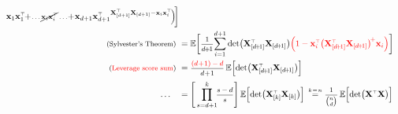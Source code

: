 \documentclass{beamer}
\begin{document}
\begin{frame}
{\begin{align*}
{\x_{1}\x_{1}^\top\!\!+\!\text{\fontsize{8}{8}\selectfont$\dots
\cancel{\x_{i}\x_{i}^\top}\dots $}\!\!+\!\x_{{d+1}}\x_{{d+1}}^\top }^{\X_{[d+1]}^{\top}\X_{[d+1]}-\x_{i}\x_{i}^\top}\!\Big)\!\bigg]\\
\hspace{-9mm}\text{\fontsize{8}{8}\selectfont(Sylvester's Theorem)}\ 
&=\E\bigg[\text{\fontsize{8}{8}\selectfont$\frac{1}{d\!\!+\!\!1}$}\!
\sum_{i=1}^{d+1} 
\det\!\big(\X_{[d\!+\!1]}^{\top}\X_{[d\!+\!1]}\big)\Red{\Big(1 - \x_{i}^\top\big(\X_{[d\!+\!1]}^{\top}\X_{[d\!+\!1]}\big)^{\!+}
\x_{i}\Big)}\bigg]\\
\hspace{-9mm}\text{\fontsize{8}{8}\selectfont(\Red{Leverage score sum})}\ &=
\text{\fontsize{8}{8}\selectfont$\frac{\Red{(d\!+\!1) - d}}{d\!+\!1}$} \,\E\Big[\!\det\!\big(\X_{[d\!+\!1]}^{\top}\X_{[d\!+\!1]}\big) \Big]\\[0.7mm]
\dots\quad &=\Bigg[\prod_{s=d+1}^k \!\!\text{\fontsize{8}{8}\selectfont$\frac{s-d}{s}$}\Bigg]
\,\E\Big[\!\det\!\big(\X_{[k]}^{\top}\X_{[k]}\big) \Big]
\, \overset{\text{\fontsize{6}{6}\selectfont$k\!=\!n$}}{=} \text{\fontsize{8}{8}\selectfont$\frac{1}{{n\choose d}}$} \,\E\Big[\!\det\!\big(\X^{\top}\X\big)\Big] %
\end{align*}
}
\only<9>{
\vspace{3.25mm}
\begin{align*}
\hspace{-3.25mm}\E\Big[
F\big(\X_{[k]}\big)\Big]
\quad\, &=\quad\,
\text{\fontsize{8}{8}\selectfont$\frac{1}{k\!\!+\!\!1}$}\!\sum_{i=1}^{k+1}
\E\Big[F\big(\X_{[k\!+\!1]-i}\big)\Big]\\
&=\quad\,
\E\bigg[\text{\fontsize{8}{8}\selectfont$\frac{1}{k\!\!+\!\!1}$} \Red{\sum_{i=1}^{k+1}
F\big(\X_{[k\!+\!1]-i}\big)}\bigg]\\
 \hspace{-3.25mm}\text{\fontsize{8}{8}\selectfont(\Red{$d$-modularity})}\quad
        &=
\text{\fontsize{8}{8}\selectfont$\frac{\Red{(k\!+\!1) - d}}{k\!+\!1}$} \,\E\Big[
\Red{F\big(\X_{[k\!+\!1]}\big)} \Big]\\[1.1mm]
\dots\quad &=\Bigg[\prod_{s=k+1}^n \!\!\text{\fontsize{8}{8}\selectfont$\frac{s-d}{s}$}\Bigg]
\,\E\Big[F\big(\X_{[n]}\big) \Big]
\hspace{4.05cm}~ %
\end{align*}
}
\end{frame}
\end{document}
